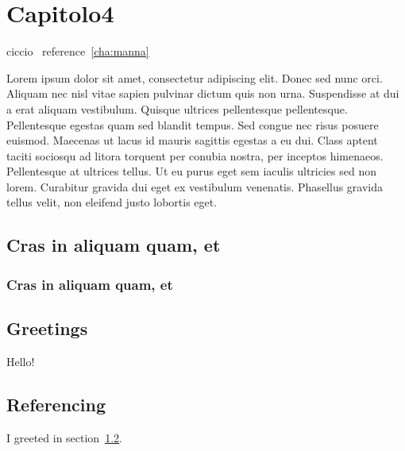 \chapter{Capitolo4}
ciccio~\label{cha:manna}
reference~\ref{cha:manna}

Lorem ipsum dolor sit amet, consectetur adipiscing elit. Donec sed nunc orci. Aliquam nec nisl vitae sapien pulvinar dictum quis non urna. Suspendisse at dui a erat aliquam vestibulum. Quisque ultrices pellentesque pellentesque. Pellentesque egestas quam sed blandit tempus. Sed congue nec risus posuere euismod. Maecenas ut lacus id mauris sagittis egestas a eu dui. Class aptent taciti sociosqu ad litora torquent per conubia nostra, per inceptos himenaeos. Pellentesque at ultrices tellus. Ut eu purus eget sem iaculis ultricies sed non lorem. Curabitur gravida dui eget ex vestibulum venenatis. Phasellus gravida tellus velit, non eleifend justo lobortis eget. 
\section{Cras in aliquam quam, et}
\subsection{Cras in aliquam quam, et}

\section{Greetings}
\label{sec:greetings}

Hello!

\section{Referencing}

I greeted in section~\ref{sec:greetings}.